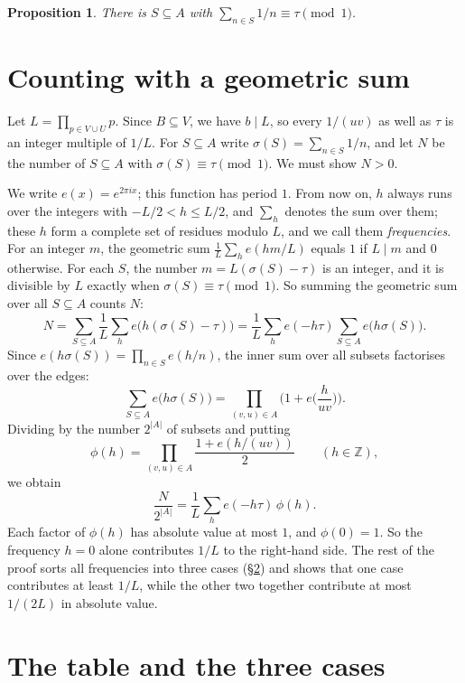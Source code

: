\documentclass[11pt]{amsart}
\newtheorem{proposition}[theorem]{Proposition}
\theoremstyle{definition}
\theoremstyle{remark}
\newcommand{\Z}{\mathbb{Z}}
\begin{document}
\begin{proposition}\label{prop:core}
There is $S\subseteq A$ with $\sum_{n\in S}1/n\equiv\tau\pmod1$.
\end{proposition}

\section{Counting with a geometric sum}\label{sec:count}

Let $L=\prod_{p\in V\cup U}p$. Since $B\subseteq V$, we have $b\mid L$, so every $1/(uv)$ as well as $\tau$ is an integer multiple of $1/L$. For $S\subseteq A$ write $\sigma(S)=\sum_{n\in S}1/n$, and let $N$ be the number of $S\subseteq A$ with $\sigma(S)\equiv\tau\pmod1$. We must show $N>0$.

We write $e(x)=e^{2\pi i x}$; this function has period $1$. From now on, $h$ always runs over the integers with $-L/2<h\le L/2$, and $\sum_h$ denotes the sum over them; these $h$ form a complete set of residues modulo $L$, and we call them \emph{frequencies}. For an integer $m$, the geometric sum $\frac1L\sum_he(hm/L)$ equals $1$ if $L\mid m$ and $0$ otherwise. For each $S$, the number $m=L(\sigma(S)-\tau)$ is an integer, and it is divisible by $L$ exactly when $\sigma(S)\equiv\tau\pmod1$. So summing the geometric sum over all $S\subseteq A$ counts $N$:
\[
 N=\sum_{S\subseteq A}\frac1L\sum_he\big(h(\sigma(S)-\tau)\big)=\frac1L\sum_{h}e(-h\tau)\sum_{S\subseteq A}e\big(h\sigma(S)\big).
\]
Since $e(h\sigma(S))=\prod_{n\in S}e(h/n)$, the inner sum over all subsets factorises over the edges:
\[
 \sum_{S\subseteq A}e\big(h\sigma(S)\big)=\prod_{(v,u)\in A}\Big(1+e\Big(\frac h{uv}\Big)\Big).
\]
Dividing by the number $2^{|A|}$ of subsets and putting
\[
 \phi(h)=\prod_{(v,u)\in A}\frac{1+e(h/(uv))}{2}\qquad(h\in\Z),
\]
we obtain
\begin{equation}\label{eq:N}
 \frac{N}{2^{|A|}}=\frac1{L}\sum_{h}e(-h\tau)\,\phi(h).
\end{equation}
Each factor of $\phi(h)$ has absolute value at most $1$, and $\phi(0)=1$. So the frequency $h=0$ alone contributes $1/L$ to the right-hand side. The rest of the proof sorts all frequencies into three cases (\S\ref{sec:table}) and shows that one case contributes at least $1/L$, while the other two together contribute at most $1/(2L)$ in absolute value.

\section{The table and the three cases}\label{sec:table}
\end{document}
